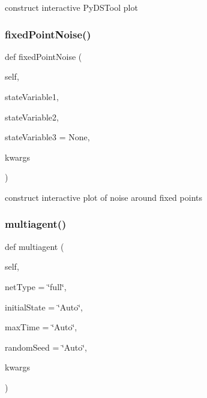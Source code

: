 construct interactive Py\+D\+S\+Tool plot 

\mbox{\label{class_mu_mo_t_1_1_mu_mo_t_1_1_mu_mo_tmodel_a7d1753df12ca6dff0b250bdd8f9334a4}} 
\subsubsection{\texorpdfstring{fixed\+Point\+Noise()}{fixedPointNoise()}}
{\footnotesize\ttfamily def fixed\+Point\+Noise (\begin{DoxyParamCaption}\item[{}]{self,  }\item[{}]{state\+Variable1,  }\item[{}]{state\+Variable2,  }\item[{}]{state\+Variable3 = {\ttfamily None},  }\item[{}]{kwargs }\end{DoxyParamCaption})}



construct interactive plot of noise around fixed points 

\mbox{\label{class_mu_mo_t_1_1_mu_mo_t_1_1_mu_mo_tmodel_a55f7cab206306b09d38863395f186dbc}} 
\subsubsection{\texorpdfstring{multiagent()}{multiagent()}}
{\footnotesize\ttfamily def multiagent (\begin{DoxyParamCaption}\item[{}]{self,  }\item[{}]{net\+Type = {\ttfamily \char`\"{}full\char`\"{}},  }\item[{}]{initial\+State = {\ttfamily \char`\"{}Auto\char`\"{}},  }\item[{}]{max\+Time = {\ttfamily \char`\"{}Auto\char`\"{}},  }\item[{}]{random\+Seed = {\ttfamily \char`\"{}Auto\char`\"{}},  }\item[{}]{kwargs }\end{DoxyParamCaption})}

